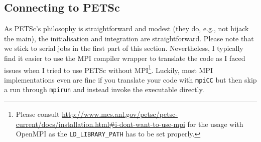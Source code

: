 \subsection{Connecting to PETSc}

As PETSc's philosophy is straightforward and modest (they do, e.g.,
not hijack the main), the initialisation and integration are straightforward.
Please note that we stick to serial jobs in the first part of this
section.
Nevertheless, I typically find it easier to use 
the MPI compiler wrapper to translate the code as I faced
issues when I tried to use PETSc without MPI\footnote{Please consult
\url{http://www.mcs.anl.gov/petsc/petsc-current/docs/installation.html#i-dont-want-to-use-mpi}
for the usage with OpenMPI as the \texttt{LD\_LIBRARY\_PATH} has to be set
properly.}.
Luckily, most MPI implementations even are fine if you translate your code with
\texttt{mpiCC} but then skip a run through \texttt{mpirun} and instead invoke
the executable directly.


